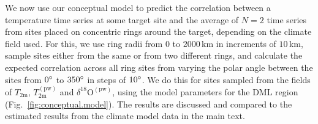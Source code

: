 \documentclass[cp, manuscript]{copernicus}
\begin{document}
We now use our conceptual model to predict the correlation between a temperature
time series at some target site and the average of $N=2$ time series from sites
placed on concentric rings around the target, depending on the climate field
used. For this, we use ring radii from $0$ to $2000$\,km in increments of
$10$\,km, sample sites either from the same or from two different rings, and
calculate the expected correlation across all ring sites from varying the polar
angle between the sites from $0^{\circ}$ to $350^{\circ}$ in steps of
$10^{\circ}$. We do this for sites sampled from the fields of $T_{\mathrm{2m}}$,
$T_{\mathrm{2m}}^{\mathrm{(pw)}}$ and $\delta^{18}\mathrm{O}^{\mathrm{(pw)}}$,
using the model parameters for the DML region (Fig.~\ref{fig:conceptual.model}).
The results are discussed and compared to the estimated results from the climate
model data in the main text.

\noappendix





\end{document}
